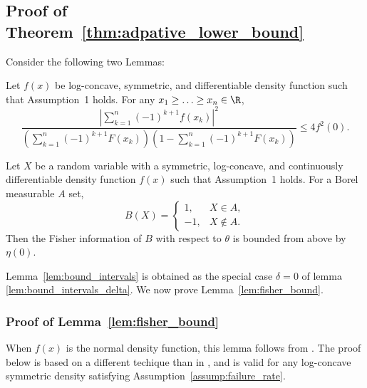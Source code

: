 \subsection{Proof of Theorem~\ref{thm:adpative_lower_bound}
\label{proof:thm:adpative_lower_bound}
}
Consider the following two Lemmas:
\begin{lem} \label{lem:bound_intervals}
Let $f(x)$ be log-concave, symmetric, and differentiable density function such that Assumption~1 holds. For any $x_1 \geq \ldots \geq x_n \in \R$,
\begin{equation}
\frac{ \left| \sum_{k=1}^n (-1)^{k+1} f(x_k) \right|^2 }
{\left( \sum_{k=1}^n (-1)^{k+1} F(x_k) \right) \left(1- \sum_{k=1}^n (-1)^{k+1} F(x_k) \right) } 
\leq  4f^2(0). 
\label{eq:lem_bound_intervals}
\end{equation}
\end{lem}
\begin{lem} \label{lem:fisher_bound}
Let $X$ be a random variable with a symmetric, log-concave, and continuously differentiable density function $f(x)$ such that Assumption~1 holds. For a Borel measurable $A$ set, 
\[
B(X) = \begin{cases} 1,& X \in A, \\
-1, & X \notin A.
\end{cases}
\]
Then the Fisher information of $B$ with respect to $\theta$ is bounded from above by $\eta(0)$.
\end{lem}

Lemma~\ref{lem:bound_intervals} is obtained as the special case $\delta = 0$ of lemma \ref{lem:bound_intervals_delta}. 
We now prove Lemma~\ref{lem:fisher_bound}.
\subsubsection*{Proof of Lemma~\ref{lem:fisher_bound}}
When $f(x)$ is the normal density function, this lemma follows from \cite[Thm. 3]{Barnes2018}. The proof below is based on a different techique than in \cite{Barnes2018}, and is valid for any log-concave symmetric density satisfying Assumption~\ref{assump:failure_rate}. \\

